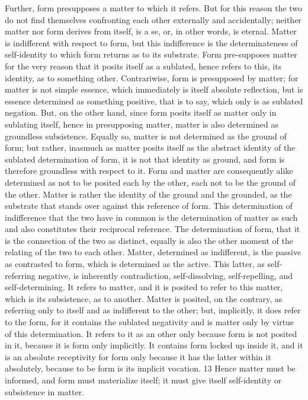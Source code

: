 Further, form presupposes a matter to which it refers. But for this reason
the two do not find themselves confronting each other externally and
accidentally; neither matter nor form derives from itself, is a se, or, in
other words, is eternal. Matter is indifferent with respect to form, but this
indifference is the determinateness of self-identity to which form returns
as to its substrate. Form pre-supposes matter for the very reason that it
posits itself as a sublated, hence refers to this, its identity, as to something
other. Contrariwise, form is presupposed by matter; for matter is not
simple essence, which immediately is itself absolute reflection, but is essence
determined as something positive, that is to say, which only is as sublated
negation.  But, on the other hand, since form posits itself as matter only in
sublating itself, hence in presupposing matter, matter is also determined as
groundless subsistence. Equally so, matter is not determined as the ground
of form; but rather, inasmuch as matter posits itself as the abstract identity
of the sublated determination of form, it is not that identity as ground,
and form is therefore groundless with respect to it. Form and matter are
consequently alike determined as not to be posited each by the other, each
not to be the ground of the other. Matter is rather the identity of the
ground and the grounded, as the substrate that stands over against this
reference of form. This determination of indifference that the two have in
common is the determination of matter as such and also constitutes their
reciprocal reference. The determination of form, that it is the connection
of the two as distinct, equally is also the other moment of the relating of
the two to each other.  Matter, determined as indifferent, is the passive as
contrasted to form, which is determined as the active. This latter, as self-
referring negative, is inherently contradiction, self-dissolving, self-repelling,
and self-determining. It refers to matter, and it is posited to refer to this
matter, which is its subsistence, as to another. Matter is posited, on the
contrary, as referring only to itself and as indifferent to the other; but,
implicitly, it does refer to the form, for it contains the sublated negativity
and is matter only by virtue of this determination. It refers to it as an other
only because form is not posited in it, because it is form only implicitly.
It contains form locked up inside it, and it is an absolute receptivity for
form only because it has the latter within it absolutely, because to be form
is its implicit vocation. 13 Hence matter must be informed, and form must
materialize itself; it must give itself self-identity or subsistence in matter.

